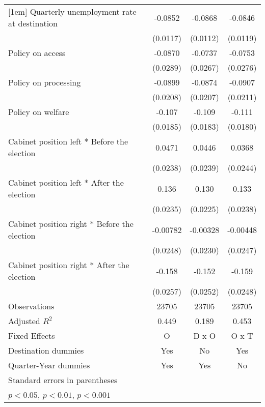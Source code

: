 \begin{table}[htbp]
\begin{tabular}{l*{3}{c}}
[1em]
Quarterly unemployment rate at destination&     -0.0852\sym{***}&     -0.0868\sym{***}&     -0.0846\sym{***}\\
                    &    (0.0117)         &    (0.0112)         &    (0.0119)         \\
[1em]
Policy on access    &     -0.0870\sym{**} &     -0.0737\sym{**} &     -0.0753\sym{**} \\
                    &    (0.0289)         &    (0.0267)         &    (0.0276)         \\
[1em]
Policy on processing&     -0.0899\sym{***}&     -0.0874\sym{***}&     -0.0907\sym{***}\\
                    &    (0.0208)         &    (0.0207)         &    (0.0211)         \\
[1em]
Policy on welfare   &      -0.107\sym{***}&      -0.109\sym{***}&      -0.111\sym{***}\\
                    &    (0.0185)         &    (0.0183)         &    (0.0180)         \\
[1em]
Cabinet position left * Before the election&      0.0471         &      0.0446         &      0.0368         \\
                    &    (0.0238)         &    (0.0239)         &    (0.0244)         \\
[1em]
Cabinet position left * After the election&       0.136\sym{***}&       0.130\sym{***}&       0.133\sym{***}\\
                    &    (0.0235)         &    (0.0225)         &    (0.0238)         \\
[1em]
Cabinet position right * Before the election&    -0.00782         &    -0.00328         &    -0.00448         \\
                    &    (0.0248)         &    (0.0230)         &    (0.0247)         \\
[1em]
Cabinet position right * After the election&      -0.158\sym{***}&      -0.152\sym{***}&      -0.159\sym{***}\\
                    &    (0.0257)         &    (0.0252)         &    (0.0248)         \\
\hline
Observations        &       23705         &       23705         &       23705         \\
Adjusted \(R^{2}\)  &       0.449         &       0.189         &       0.453         \\
Fixed Effects       &           O         &       D x O         &       O x T         \\
Destination dummies &         Yes         &          No         &         Yes         \\
Quarter-Year dummies&         Yes         &         Yes         &          No         \\
\hline\hline
\multicolumn{4}{l}{\footnotesize Standard errors in parentheses}\\
\multicolumn{4}{l}{\footnotesize \sym{*} \(p<0.05\), \sym{**} \(p<0.01\), \sym{***} \(p<0.001\)}\\
\end{tabular}
\end{table}
